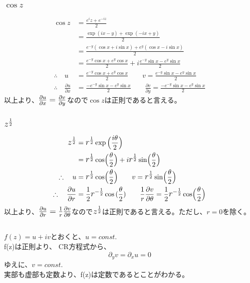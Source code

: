 \documentclass[dvipdfmx,a4paper]{jsarticle}
\begin{document}
\subsubsection{$\cos{z}$}
\begin{align*}
\cos{z} &= \frac{e^iz + e^{-iz}}{2}\\
&= \frac{\exp{(ix - y)} + \exp{(-ix + y)}}{2}\\
&= \frac{e^{-y}(\cos{x} + i\sin{x}) + e^{y}(\cos{x} -i \sin{x})}{2}\\
&= \frac{e^{-y}\cos{x} + e^{y}\cos{x}}{2} + i\frac{e^{-y}\sin{x} - e^{y}\sin{x}}{2}\\
\therefore \quad u &= \frac{e^{-y}\cos{x} + e^{y}\cos{x}}{2} \qquad v = \frac{e^{-y}\sin{x} - e^{y}\sin{x}}{2}\\
\therefore \quad \frac{\partial u}{\partial x} &= \frac{-e^{-y}\sin{x} - e^{y}\sin{x}}{2}  \qquad \frac{\partial v}{\partial y} = \frac{-e^{-y}\sin{x} - e^{y}\sin{x}}{2}
\end{align*}
以上より、$\mbox{\large $\frac{\partial u}{\partial x} = \frac{\partial v}{\partial y}$}$なので$\cos{z}$は正則であると言える。

\subsubsection{$\mbox{\large $z^{\frac{1}{2}}$}$}
\begin{align*}
\mbox{\large $z^{\frac{1}{2}}$} &= \mbox{\large $r^{\frac{1}{2}}$}\exp{\Bigl(\frac{i\theta}{2}\Bigr)}\\
&= \mbox{\large $r^{\frac{1}{2}}$}\cos \Bigl(\frac{\theta}{2}\Bigr) + i \mbox{\large $r^{\frac{1}{2}}$}\sin \Bigl(\frac{\theta}{2}\Bigr)\\
\therefore \quad u &= \mbox{\large $r^{\frac{1}{2}}$}\cos \Bigl(\frac{\theta}{2}\Bigr) \qquad v = \mbox{\large $r^{\frac{1}{2}}$}\sin \Bigl(\frac{\theta}{2}\Bigr)\\
\therefore \quad \frac{\partial u}{\partial r} &= \frac{1}{2}\mbox{\large $r^{-\frac{1}{2}}$}\cos{(\frac{\theta}{2})} \qquad \frac{1}{r}\frac{\partial v}{\partial \theta} = \frac{1}{2} \mbox{\large $r^{-\frac{1}{2}}$}\cos \Bigl(\frac{\theta}{2}\Bigr)
\end{align*}
以上より、$\mbox{\large $\frac{\partial u}{\partial r} = \frac{1}{r}\frac{\partial v}{\partial \theta}$}$なので$\mbox{\large $z^{\frac{1}{2}}$}$は正則であると言える。ただし、$r=0$を除く。\\

\subsection{}
$f(z) = u+iv $とおくと、$u=const.$\\
f(z)は正則より、 CR方程式から、
$$
\partial_y v = \partial_x u = 0
$$
ゆえに、$v=const.$\\
実部も虚部も定数より、f(z)は定数であるとことがわかる。\\
\end{document}
